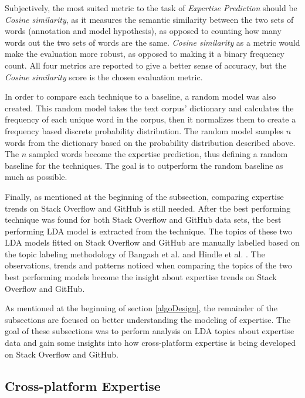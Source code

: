        Subjectively, the most suited metric to the task of \emph{Expertise Prediction} should be \emph{Cosine similarity}, as it measures the semantic similarity between the two sets of words (annotation and model hypothesis), as opposed to counting how many words out the two sets of words are the same. \emph{Cosine similarity} as a metric would make the evaluation more robust, as opposed to making it a binary frequency count. All four metrics are reported to give a better sense of accuracy, but the \emph{Cosine similarity} score is the chosen evaluation metric.
        
        In order to compare each technique to a baseline, a random model was also created. This random model takes the text corpus' dictionary and calculates the frequency of each unique word in the corpus, then it normalizes them to create a frequency based discrete probability distribution. The random model samples $n$ words from the dictionary based on the probability distribution described above. The $n$ sampled words become the expertise prediction, thus defining a random baseline for the techniques. The goal is to outperform the random baseline as much as possible.
        
        Finally, as mentioned at the beginning of the subsection, comparing expertise trends on Stack Overflow and GitHub is still needed. After the best performing technique was found for both Stack Overflow and GitHub data sets, the best performing LDA model is extracted from the technique. The topics of these two LDA models fitted on Stack Overflow and GitHub are manually labelled based on the topic labeling methodology of Bangash et al. \cite{bangash2019developers} and Hindle et al. \cite{hindle2012relating}. The observations, trends and patterns noticed when comparing the topics of the two best performing models become the insight about expertise trends on Stack Overflow and GitHub.
     
        As mentioned at the beginning of section \ref{algoDesign}, the remainder of the subsections are focused on better understanding the modeling of expertise. The goal of these subsections was to perform analysis on LDA topics about expertise data and gain some insights into how cross-platform expertise is being developed on Stack Overflow and GitHub.
    
    \subsection{Cross-platform Expertise\label{RQ2_task}}
    
